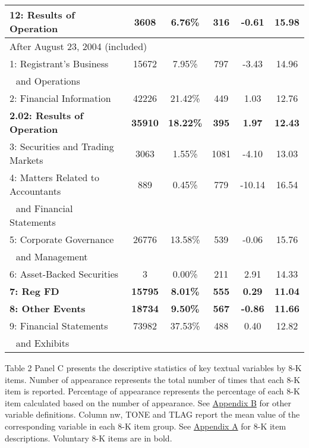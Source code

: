 \begin{table}[H]
\begin{center}
\begin{tabular}{lccccc}
  		\textbf{12: Results of Operation} & \textbf{3608} & \textbf{6.76\%} & \textbf{316} & \textbf{-0.61} & \textbf{15.98} \\
  		\midrule
  		\multicolumn{6}{l}{After August 23, 2004 (included)} \\
  		\midrule
  		1: Registrant's Business & 15672 & 7.95\% & 797 & -3.43 & 14.96 \\
  		\: \,\, and Operations & &  &  &  & \\
  		2: Financial Information & 42226 & 21.42\% & 449 & 1.03 & 12.76 \\
  		\textbf{2.02: Results of Operation} & \textbf{35910} & \textbf{18.22\%} & \textbf{395} & \textbf{1.97} & \textbf{12.43} \\
  		3: Securities and Trading Markets & 3063 & 1.55\% & 1081 & -4.10 & 13.03 \\
  		4: Matters Related to Accountants & 889 & 0.45\% & 779 & -10.14 & 16.54 \\
  		\: \,\, and Financial Statements & &  &  &  & \\
  		5: Corporate Governance & 26776 & 13.58\% & 539 & -0.06 & 15.76 \\
  		\: \,\, and Management & &  &  &  & \\
  		6: Asset-Backed Securities & 3 & 0.00\% & 211 & 2.91 & 14.33 \\
  		\textbf{7: Reg FD} & \textbf{15795} & \textbf{8.01\%} & \textbf{555} & \textbf{0.29} & \textbf{11.04} \\
  		\textbf{8: Other Events} & \textbf{18734} & \textbf{9.50\%} & \textbf{567} & \textbf{-0.86} & \textbf{11.66} \\
  		9: Financial Statements & 73982 & 37.53\% & 488 & 0.40 & 12.82 \\
  		\: \,\, and Exhibits & &  &  &  & \\
  		\bottomrule
  		\bottomrule
  	\end{tabular}%
  \end{center}
	\begin{footnotesize}
		\noindent Table 2 Panel C presents the descriptive statistics of key textual variables by 8-K items. Number of appearance represents the total number of times that each 8-K item is reported. Percentage of appearance represents the percentage of each 8-K item calculated based on the number of appearance. See \hyperref[appb]{Appendix B} for other variable definitions. Column nw, TONE and TLAG report the mean value of the corresponding variable in each 8-K item group. See \hyperref[appa]{Appendix A} for 8-K item descriptions. Voluntary 8-K items are in bold.
	\end{footnotesize}
\end{table}%
